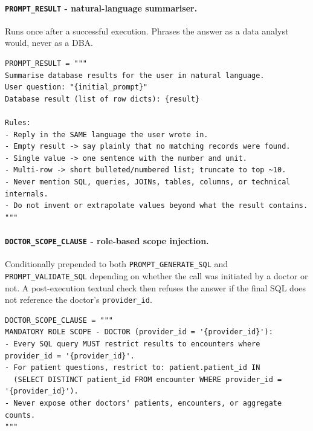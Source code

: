 \paragraph{\texttt{PROMPT\_\allowbreak RESULT} - natural-language summariser.} Runs once after a successful execution. Phrases the answer as a data analyst would, never as a DBA.

\begin{lstlisting}[style=pythonstyle]
PROMPT_RESULT = """
Summarise database results for the user in natural language.
User question: "{initial_prompt}"
Database result (list of row dicts): {result}

Rules:
- Reply in the SAME language the user wrote in.
- Empty result -> say plainly that no matching records were found.
- Single value -> one sentence with the number and unit.
- Multi-row -> short bulleted/numbered list; truncate to top ~10.
- Never mention SQL, queries, JOINs, tables, columns, or technical internals.
- Do not invent or extrapolate values beyond what the result contains.
"""
\end{lstlisting}

\paragraph{\texttt{DOCTOR\_\allowbreak SCOPE\_\allowbreak CLAUSE} - role-based scope injection.} Conditionally prepended to both \texttt{PROMPT\_\allowbreak GENERATE\_\allowbreak SQL} and \texttt{PROMPT\_\allowbreak VALIDATE\_\allowbreak SQL} depending on whether the call was initiated by a doctor or not. A post-execution textual check then refuses the answer if the final SQL does not reference the doctor's \texttt{provider\_id}.

\begin{lstlisting}[style=pythonstyle]
DOCTOR_SCOPE_CLAUSE = """
MANDATORY ROLE SCOPE - DOCTOR (provider_id = '{provider_id}'):
- Every SQL query MUST restrict results to encounters where provider_id = '{provider_id}'.
- For patient questions, restrict to: patient.patient_id IN
  (SELECT DISTINCT patient_id FROM encounter WHERE provider_id = '{provider_id}').
- Never expose other doctors' patients, encounters, or aggregate counts.
"""
\end{lstlisting}